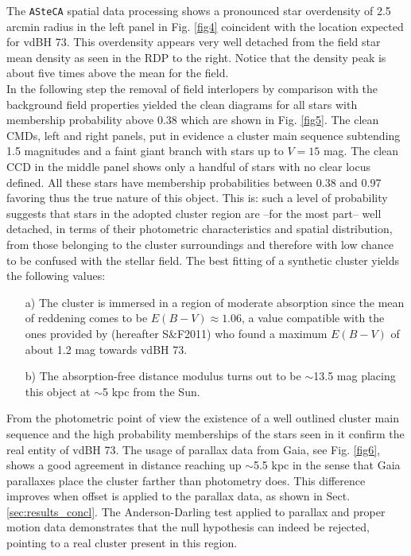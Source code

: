 \documentclass[draft]{aa}
\begin{document}
The \texttt{ASteCA} spatial data processing shows a pronounced star overdensity
of 2.5 arcmin radius in the left panel in Fig. \ref{fig4} coincident with the
location expected for vdBH 73. This overdensity appears very well
detached from the field star mean density as seen in the RDP to the right.
Notice that the density peak is about five times above the mean for the field.\\

In the following step the removal of field interlopers by comparison with the
background field properties yielded the clean diagrams for all stars with
membership probability above 0.38 which are shown in Fig. \ref{fig5}. The
clean CMDs, left and right panels, put in evidence a cluster main sequence
subtending 1.5 magnitudes and a faint giant branch with stars up to $V=15$ mag.
The clean CCD in the middle panel shows only a handful of stars with no clear
locus defined. All these stars have membership probabilities between 0.38 and
0.97 favoring thus the true nature of this object. This is: such a level of
probability suggests that stars in the adopted cluster region are --for the
most part-- well detached, in terms of their photometric characteristics and
spatial distribution, from those belonging to the cluster surroundings and
therefore with low chance to be confused with the stellar field. The best
fitting of a synthetic cluster yields the following values:

\begin{itemize}
\item [a)] The cluster is immersed in a region of moderate absorption
since the mean of reddening comes to be $E(B-V)\approx1.06$, a value compatible
with the ones provided by \cite{Schlafly_2011} (hereafter S\&F2011) who
found a maximum $E(B-V)$ of about 1.2 mag towards vdBH 73.
\item [b)] The absorption-free distance modulus turns out to be $\sim$13.5 mag
placing this object at $\sim$5 kpc from the Sun.
\end{itemize}

From the photometric point of view the existence of a well outlined cluster main
sequence and the high probability memberships of the stars seen in it confirm
the real entity of vdBH 73. The usage of parallax data from Gaia, see Fig. 
\ref{fig6}, shows a good agreement in distance reaching up $\sim$5.5 kpc in the
sense that Gaia parallaxes place the cluster farther than
photometry does. This difference improves when offset is applied to the
parallax data, as shown in Sect. \ref{sec:results_concl}.
The Anderson-Darling test applied to parallax and proper motion data
demonstrates that the null hypothesis can indeed be rejected, pointing to
a real cluster present in this region.\\
\end{document}
